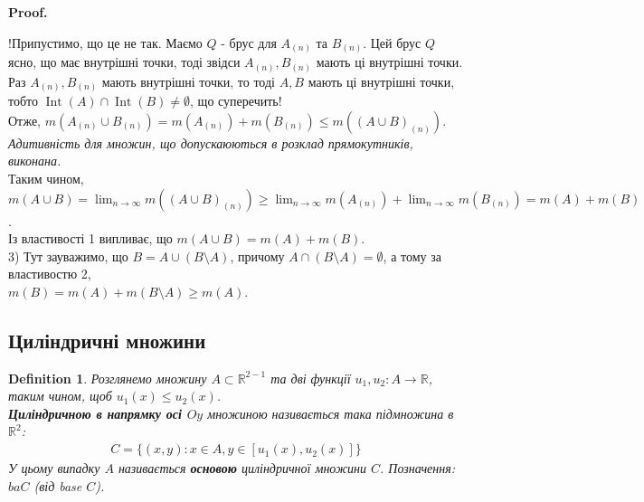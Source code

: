 \documentclass[a4paper, 10pt]{article}
\makeatletter
\def\qed{$\blacksquare$}
\theoremstyle{theoremdd}
\theoremstyle{theoremdd}
\newtheorem{definition}[theorem]{Definition}
\theoremstyle{theoremdd}
\theoremstyle{theoremdd}
\theoremstyle{theoremdd}
\theoremstyle{theoremdd}
\theoremstyle{theoremdd}
\theoremstyle{theoremdd}
\renewenvironment{proof}[1][Proof.\\]{\par
\pushQED{\hfill \qed}%
\normalfont \topsep6\p@\@plus6\p@\relax
\trivlist
\item\relax
{\bfseries
#1\@addpunct{.}}\hspace\labelsep\ignorespaces
}{%
\popQED\endtrivlist\@endpefalse
}
\DeclareMathOperator{\Int}{Int}
\makeatother
\begin{document}
\begin{proof}
!Припустимо, що це не так. Маємо $Q$ - брус для $A_{(n)}$ та $B_{(n)}$. Цей брус $Q$ ясно, що має внутрішні точки, тоді звідси $A_{(n)}, B_{(n)}$ мають ці внутрішні точки. Раз $A_{(n)},B_{(n)}$ мають внутрішні точки, то тоді $A,B$ мають ці внутрішні точки, тобто $\Int(A) \cap \Int(B) \neq \emptyset$, що суперечить!\\
Отже, $m(A_{(n)} \cup B_{(n)}) = m(A_{(n)}) + m(B_{(n)}) \leq m((A \cup B)_{(n)})$.\\
\textit{Адитивність для множин, що допускаюються в розклад прямокутників, виконана.}\\
Таким чином, $m(A \cup B) = \displaystyle\lim_{n \to \infty} m((A \cup B)_{(n)}) \geq \lim_{n \to \infty} m(A_{(n)}) + \lim_{n \to \infty} m(B_{(n)}) = m(A) + m(B)$.\\
Із властивості 1 випливає, що $m(A \cup B) = m(A) + m(B)$.
\bigskip \\
3) Тут зауважимо, що $B = A \cup (B \setminus A)$, причому $A \cap (B \setminus A) = \emptyset$, а тому за властивостю 2,\\
$m(B) = m(A) + m(B \setminus A) \geq m(A)$.
\end{proof}

\subsection{Циліндричні множини}
\begin{definition}
Розглянемо множину $A \subset \mathbb{R}^{2-1}$ та дві функції $u_1,u_2: A \to \mathbb{R}$, таким чином, щоб $u_1(x) \leq u_2(x)$.\\
\textbf{Циліндричною в напрямку осі $Oy$} множиною називається така підмножина в $\mathbb{R}^2$:
\begin{align*}
C = \{ (x,y): x \in A, y \in [u_1(x),u_2(x)] \}
\end{align*}
У цьому випадку $A$ називається \textbf{основою} циліндричної множини $C$. Позначення: $ba C$ (від base $C$).
\begin{figure}[H]
\centering
{}
\end{figure}
\end{definition}
\end{document}
